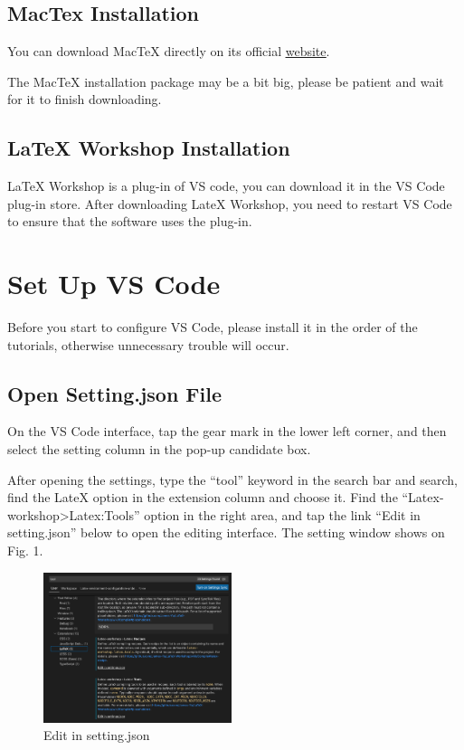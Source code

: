 \documentclass[conference]{IEEEtran}
\begin{document}
\subsection{MacTex Installation}
You can download MacTeX directly on its official \href{http://www.tug.org/mactex/mactex-download.html}{\underline{website}}.

The MacTeX installation package may be a bit big, please be patient and wait for it to finish downloading.

\subsection{LaTeX Workshop Installation}
LaTeX Workshop is a plug-in of VS code, you can download it in the VS Code plug-in store. 
After downloading LateX Workshop, you need to restart VS Code to ensure that the software uses the plug-in.

\section{Set Up VS Code}
Before you start to configure VS Code, please install it in the order of the tutorials, otherwise unnecessary trouble will occur.

\subsection{Open Setting.json File}\label{AA}
On the VS Code interface, tap the gear mark in the lower left corner, and then select the setting column in the pop-up candidate box.

After opening the settings, type the “tool” keyword in the search bar and search, find the LateX option in the extension column and choose it. 
Find the “Latex-workshop>Latex:Tools” option in the right area, and tap the link “Edit in setting.json” below to open the editing interface. 
The setting window shows on Fig. 1.

\begin{figure}[htbp]
    \centerline{\includegraphics[width=0.49\textwidth]{show_tools.png}}
    \caption{Edit in setting.json}
    \label{fig1}
\end{figure}
\end{document}
